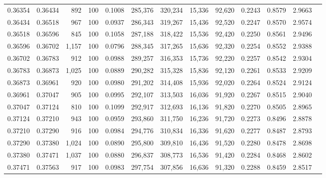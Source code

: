 \begin{tabular}{rrrrrrrrrrrrr}
0.36354 & 0.36434 &   892 & 100 &                                     0.1008 & 285,376 & 320,234 &  15,336 &  92,620 & 0.2243 & 0.8579 & 2.9663 \\
0.36434 & 0.36518 &   967 & 100 &                                     0.0937 & 286,343 & 319,267 &  15,436 &  92,520 & 0.2247 & 0.8570 & 2.9574 \\
0.36518 & 0.36596 &   845 & 100 &                                     0.1058 & 287,188 & 318,422 &  15,536 &  92,420 & 0.2250 & 0.8561 & 2.9496 \\
0.36596 & 0.36702 & 1,157 & 100 &                                     0.0796 & 288,345 & 317,265 &  15,636 &  92,320 & 0.2254 & 0.8552 & 2.9388 \\
0.36702 & 0.36783 &   912 & 100 &                                     0.0988 & 289,257 & 316,353 &  15,736 &  92,220 & 0.2257 & 0.8542 & 2.9304 \\
0.36783 & 0.36873 & 1,025 & 100 &                                     0.0889 & 290,282 & 315,328 &  15,836 &  92,120 & 0.2261 & 0.8533 & 2.9209 \\
0.36873 & 0.36961 &   920 & 100 &                                     0.0980 & 291,202 & 314,408 &  15,936 &  92,020 & 0.2264 & 0.8524 & 2.9124 \\
0.36961 & 0.37047 &   905 & 100 &                                     0.0995 & 292,107 & 313,503 &  16,036 &  91,920 & 0.2267 & 0.8515 & 2.9040 \\
0.37047 & 0.37124 &   810 & 100 &                                     0.1099 & 292,917 & 312,693 &  16,136 &  91,820 & 0.2270 & 0.8505 & 2.8965 \\
0.37124 & 0.37210 &   943 & 100 &                                     0.0959 & 293,860 & 311,750 &  16,236 &  91,720 & 0.2273 & 0.8496 & 2.8878 \\
0.37210 & 0.37290 &   916 & 100 &                                     0.0984 & 294,776 & 310,834 &  16,336 &  91,620 & 0.2277 & 0.8487 & 2.8793 \\
0.37290 & 0.37380 & 1,024 & 100 &                                     0.0890 & 295,800 & 309,810 &  16,436 &  91,520 & 0.2280 & 0.8478 & 2.8698 \\
0.37380 & 0.37471 & 1,037 & 100 &                                     0.0880 & 296,837 & 308,773 &  16,536 &  91,420 & 0.2284 & 0.8468 & 2.8602 \\
0.37471 & 0.37563 &   917 & 100 &                                     0.0983 & 297,754 & 307,856 &  16,636 &  91,320 & 0.2288 & 0.8459 & 2.8517 \\

\end{tabular}

